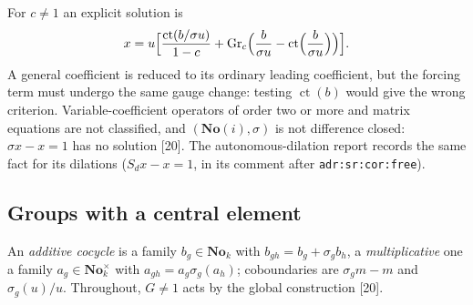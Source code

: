 \documentclass[11pt,oneside]{article}
\numberwithin{equation}{section}
\theoremstyle{definition}
\theoremstyle{remark}
\newcommand{\No}{\mathbf{No}}
\newcommand{\SC}{\mathbf{No}(i)}
\newcommand{\ct}{\operatorname{ct}}
\newcommand{\src}[1]{\textup{\textsf{\small[#1]}}}
\newcommand{\lbl}[1]{\nolinkurl{#1}}
\begin{document}
For $c\ne1$ an explicit solution is
\begin{equation}\label{opa:us:eq:firstorderformula}
 x=u\Bigl[\frac{\ct(b/\sigma u)}{1-c}+\operatorname{Gr}_c\Bigl(\frac b{\sigma u}-\ct\Bigl(\frac b{\sigma u}\Bigr)\Bigr)\Bigr].
\end{equation}
A general coefficient is reduced to its ordinary leading coefficient, but the forcing term must undergo the same gauge change: testing $\ct(b)$ would
give the wrong criterion. Variable-coefficient operators of order two or more and matrix equations are not classified, and $(\SC,\sigma)$ is not
difference closed: $\sigma x-x=1$ has no solution \src{20}. The autonomous-dilation report records the same fact for its dilations ($S_dx-x=1$, in its
comment after \lbl{adr:sr:cor:free}).

\subsection{Groups with a central element}

An \emph{additive cocycle} is a family $b_g\in\No_k$ with $b_{gh}=b_g+\sigma_gb_h$, a \emph{multiplicative} one a family $a_g\in\No_k^\times$ with
$a_{gh}=a_g\sigma_g(a_h)$; coboundaries are $\sigma_gm-m$ and $\sigma_g(u)/u$. Throughout, $G\ne1$ acts by the global construction \src{20}.
\end{document}
